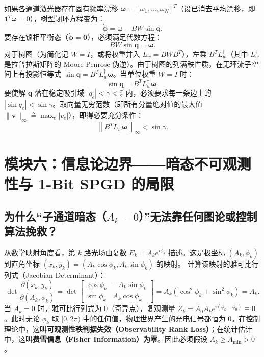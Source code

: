 \documentclass[UTF8, a4paper, 11pt]{ctexart}
\begin{document}
如果各通道激光器存在固有频率漂移 $\bm{\omega} = [\omega_1, \dots, \omega_N]^T$（设已消去平均漂移，即 $\bm{1}^T \bm{\omega} = 0$），树型闭环方程变为：
\[
    \dot{\bm{\phi}} = \bm{\omega} - B W \sin\bm{q}.
\]
要存在锁相平衡态（$\dot{\bm{\phi}} = \bm{0}$），必须满足代数方程：
\[
    B W \sin\bm{q} = \bm{\omega}.
\]
对于树图（为简化记 $W = I$，或将权重并入 $L_w = B W B^T$），左乘 $B^T L_w^\dagger$（其中 $L_w^\dagger$ 是拉普拉斯矩阵的 Moore-Penrose 伪逆）。由于树图的列满秩性质，在无环流子空间上有投影恒等式 $\sin\bm{q} = B^T L_w^\dagger \bm{\omega}$。当单位权重 $W=I$ 时：
\[
    \sin\bm{q} = B^T L_w^\dagger \bm{\omega}.
\]
要使解 $\bm{q}$ 落在稳定吸引域 $|q_e| < \gamma < \frac{\pi}{2}$ 内，必须要求每一条边上的 $|\sin q_e| < \sin\gamma$。取向量无穷范数（即所有分量绝对值的最大值 $\|\bm{v}\|_\infty \triangleq \max_e |v_e|$），即得必要充分条件：
\[
    \boxed{
    \left\| B^T L_w^\dagger \bm{\omega} \right\|_\infty < \sin\gamma.
    }
\]

\section{模块六：信息论边界——暗态不可观测性与 1-Bit SPGD 的局限}

\subsection{为什么“子通道暗态（\texorpdfstring{$A_k = 0$}{Ak = 0}）”无法靠任何图论或控制算法挽救？}

从数学映射角度看，第 $k$ 路光场由复数 $E_k = A_k e^{i\phi_k}$ 描述。这是极坐标 $(A_k, \phi_k)$ 到直角坐标 $(x_k, y_k) = (A_k\cos\phi_k, A_k\sin\phi_k)$ 的映射。
计算该映射的雅可比行列式（Jacobian Determinant）：
\[
    \det \frac{\partial(x_k, y_k)}{\partial(A_k, \phi_k)} = \det \begin{bmatrix} \cos\phi_k & -A_k\sin\phi_k \\ \sin\phi_k & A_k\cos\phi_k \end{bmatrix} = A_k(\cos^2\phi_k + \sin^2\phi_k) = A_k.
\]
当 $A_k = 0$ 时，雅可比行列式为 $0$（奇异点），复观测量 $Z_k = A_0 A_k e^{i(\phi_k - \phi_0)} \equiv 0$。此时无论 $\phi_k$ 取 $[0, 2\pi)$ 中的任何值，物理世界产生的光电信号都恒为 $0$。在控制理论中，这叫\textbf{可观测性秩判据失效（Observability Rank Loss）}；在统计估计中，这叫\textbf{费雪信息（Fisher Information）为零}。因此必须假设 $A_k \ge A_{\min} > 0$。
\end{document}
